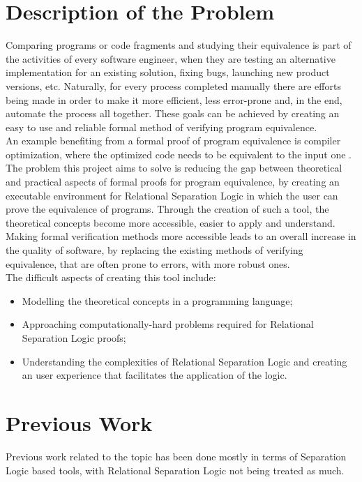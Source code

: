\documentclass[12pt,a4paper]{article}
\begin{document}
\section{Description of the Problem}
Comparing programs or code fragments and studying their equivalence is part of the activities of every software engineer, when they are testing an alternative implementation for an existing solution, fixing bugs, launching new product versions, etc. Naturally, for every process completed manually there are efforts being made in order to make it more efficient, less error-prone and, in the end, automate the process all together. These goals can be achieved by creating an easy to use and reliable formal  method of verifying program equivalence.
\\

An example benefiting from a formal proof of program equivalence is compiler optimization, where the optimized code needs to be equivalent to the input one \cite{relational}.\\

The problem this project aims to solve is reducing the gap between theoretical and practical aspects of formal proofs for program equivalence, by creating an executable environment for Relational Separation Logic in which the user can prove the equivalence of programs. Through the creation of such a tool, the theoretical concepts become more accessible, easier to apply and understand. Making formal verification methods more accessible leads to an overall increase in the quality of software, by replacing the existing methods of verifying equivalence, that are often prone to errors, with more robust ones.\\

The difficult aspects of creating this tool include:
\begin{itemize}
	\item Modelling the theoretical concepts in a programming language;
	\item Approaching computationally-hard problems required for Relational Separation Logic proofs;
	\item Understanding the complexities of Relational Separation Logic and creating an user experience that facilitates the application of the logic.
\end{itemize}

\section{Previous Work}
Previous work related to the topic has been done mostly in terms of Separation Logic based tools, with Relational Separation Logic not being treated as much. \\
\end{document}
